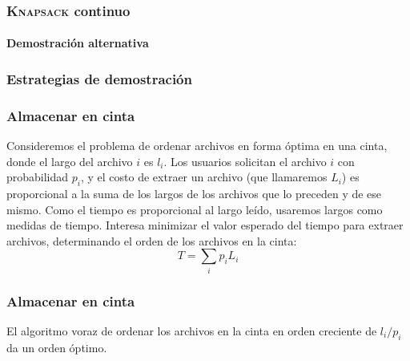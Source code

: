 \documentclass[english, spanish, fleqn,%
hyperref = {colorlinks, urlcolor = blue}%
]{beamer}
\begin{document}
\begin{frame}
  \setcounter{beamerpauses}{2}
  \frametitle{\textsc{Knapsack} continuo}
  \framesubtitle{Demostración alternativa}


\end{frame}

\begin{frame}
  \setcounter{beamerpauses}{2}
  \frametitle{Estrategias de demostración}

\end{frame}

\begin{frame}
  \frametitle{Almacenar en cinta}

  Consideremos el problema de ordenar archivos en forma óptima en una cinta,
  donde el largo del archivo \(i\) es \(l_i\).
  Los usuarios solicitan el archivo \(i\) con probabilidad \(p_i\),
  y el costo de extraer un archivo
  (que llamaremos \(L_i\))
  es proporcional a la suma de los largos de los archivos que lo preceden
  y de ese mismo.
  Como el tiempo es proporcional al largo leído,
  usaremos largos como medidas de tiempo.
  Interesa minimizar el valor esperado del tiempo para extraer archivos,
  determinando el orden de los archivos en la cinta:
  \begin{equation*}
    T
      = \sum_i p_i L_i
  \end{equation*}
\end{frame}

\begin{frame}
  \setcounter{beamerpauses}{2}
  \frametitle{Almacenar en cinta}

  \begin{theorem}
    El algoritmo voraz de ordenar los archivos en la cinta
    en orden creciente de \(l_i / p_i\) da un orden óptimo.
  \end{theorem}
\end{frame}
\end{document}
